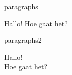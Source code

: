 \begin{saveblock}{paragraphs}
    \begin{highlightblock}[linewidth=0.5\textwidth,gobble=12]
        Hallo!
        Hoe gaat het? 
    \end{highlightblock}
\end{saveblock}

\begin{saveblock}{paragraphs2}
    \begin{highlightblock}[linewidth=0.5\textwidth,gobble=12]
        Hallo!\\
        Hoe gaat het? 
    \end{highlightblock}
\end{saveblock}


    

    



